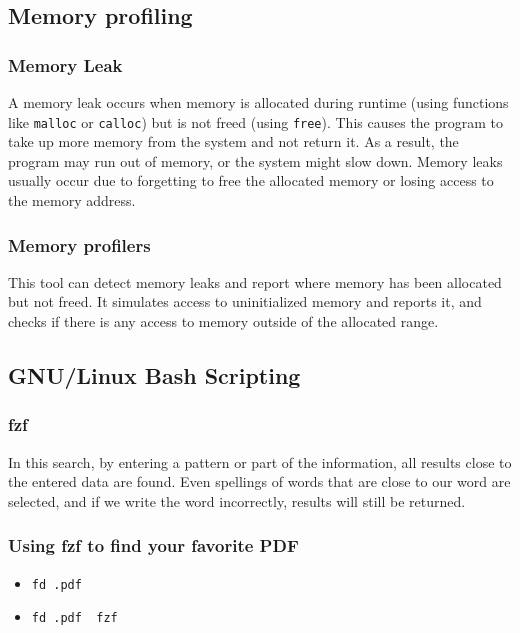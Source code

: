 \documentclass{article}
\begin{document}
    \subsection{Memory profiling}
        \subsubsection{Memory Leak}
            A memory leak occurs when memory is allocated during runtime (using functions like \texttt{malloc} or \texttt{calloc}) but is not freed (using \texttt{free}). This causes the program to take up more memory from the system and not return it. As a result, the program may run out of memory, or the system might slow down. Memory leaks usually occur due to forgetting to free the allocated memory or losing access to the memory address.

        \subsubsection{Memory profilers}
            This tool can detect memory leaks and report where memory has been allocated but not freed. It simulates access to uninitialized memory and reports it, and checks if there is any access to memory outside of the allocated range.

    \subsection{GNU/Linux Bash Scripting}
        \subsubsection{fzf}
            In this search, by entering a pattern or part of the information, all results close to the entered data are found. Even spellings of words that are close to our word are selected, and if we write the word incorrectly, results will still be returned.

        \subsubsection{Using fzf to find your favorite PDF}
            \begin{itemize}
                \item 
                    \texttt{fd .pdf}

                \item 
                    \texttt{fd .pdf \textbar\ fzf}
            \end{itemize}
            
\end{document}
